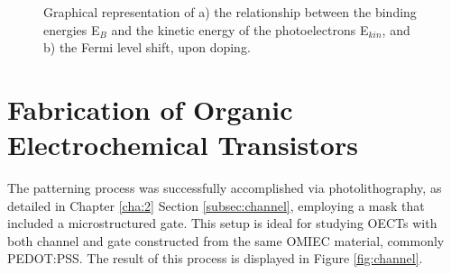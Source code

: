 \begin{figure}[ht]
	\centering
	\hspace{2em}
	\caption[Representation of the Fermi level shift upon doping]{ Graphical representation of a) the relationship between the binding energies E$_{B}$ and the kinetic energy of the photoelectrons E$_{kin}$, and b) the Fermi level shift, upon doping.} 
	\label{fig:ups}
\end{figure}


\section{Fabrication of Organic Electrochemical Transistors}
The patterning process was successfully accomplished via photolithography, as detailed in Chapter \ref{cha:2} Section \ref{subsec:channel}, employing a mask that included a microstructured gate. This setup is ideal for studying OECTs with both channel and gate constructed from the same OMIEC material, commonly PEDOT:PSS. The result of this process is displayed in Figure \ref{fig:channel}. 

